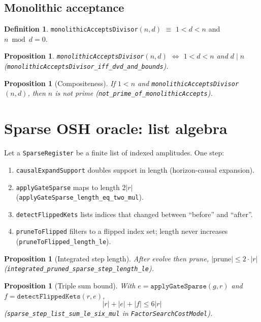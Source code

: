\documentclass[11pt,a4paper]{article}
\theoremstyle{plain}
\newtheorem{proposition}[theorem]{Proposition}
\theoremstyle{definition}
\newtheorem{definition}[theorem]{Definition}
\theoremstyle{remark}
\begin{document}
\subsection{Monolithic acceptance}

\begin{definition}
\texttt{monolithicAcceptsDivisor}$(n,d)$ $\equiv$ $1<d<n$ and $n\bmod d = 0$.
\end{definition}

\begin{proposition}
\texttt{monolithicAcceptsDivisor}$(n,d)$ $\Leftrightarrow$ $1<d<n$ and $d\mid n$
(\texttt{monolithicAcceptsDivisor\_iff\_dvd\_and\_bounds}).
\end{proposition}

\begin{proposition}[Compositeness]
If $1<n$ and \texttt{monolithicAcceptsDivisor}$(n,d)$, then $n$ is not prime
(\texttt{not\_prime\_of\_monolithicAccepts}).
\end{proposition}

\section{Sparse OSH oracle: list algebra}

Let a \texttt{SparseRegister} be a finite list of indexed amplitudes. One step:
\begin{enumerate}
\item \texttt{causalExpandSupport} doubles support in length (horizon-causal expansion).
\item \texttt{applyGateSparse} maps to length $2|r|$ (\texttt{applyGateSparse\_length\_eq\_two\_mul}).
\item \texttt{detectFlippedKets} lists indices that changed between ``before'' and ``after''.
\item \texttt{pruneToFlipped} filters to a flipped index set; length never increases
      (\texttt{pruneToFlipped\_length\_le}).
\end{enumerate}

\begin{proposition}[Integrated step length]
After evolve then prune,
$|\mathrm{prune}| \le 2 \cdot |r|$ (\texttt{integrated\_pruned\_sparse\_step\_length\_le}).
\end{proposition}

\begin{proposition}[Triple sum bound]
With $e=\texttt{applyGateSparse}(g,r)$ and $f=\texttt{detectFlippedKets}(r,e)$,
\[
|r| + |e| + |f| \le 6|r|
\]
(\texttt{sparse\_step\_list\_sum\_le\_six\_mul} in \texttt{FactorSearchCostModel}).
\end{proposition}
\end{document}
